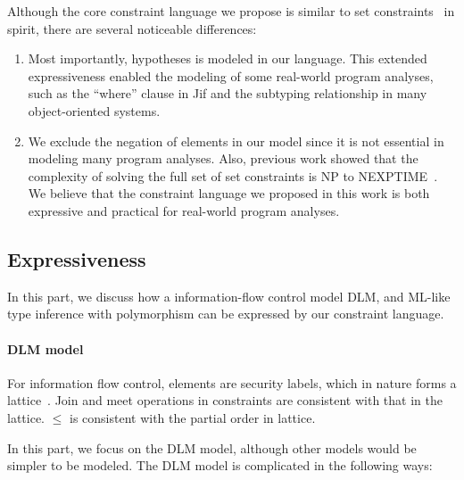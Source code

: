 Although the core constraint language we propose is similar to set
constraints~\cite{aiken-setconstraint} in spirit, there are several
noticeable differences:

\begin{enumerate}

\item Most importantly, hypotheses is modeled in our language. This extended
expressiveness enabled the modeling of some real-world program analyses, such
as the ``where'' clause in Jif and the subtyping relationship in many
object-oriented systems. 

\item We exclude the negation of elements in our model since it is not
essential in modeling many program analyses. Also, previous work showed that
the complexity of solving the full set of set constraints is NP to
NEXPTIME~\cite{aiken-complexity}. We believe that the constraint language we
proposed in this work is both expressive and practical for real-world program
analyses.

\end{enumerate}

\subsection{Expressiveness}


In this part, we discuss how a information-flow control model DLM, and ML-like
type inference with polymorphism can be expressed by our constraint language.

\paragraph{DLM model}

For information flow control, elements are security labels, which in
nature forms a lattice~\cite{denning-lattice}. Join and meet
operations in constraints are consistent with that in the lattice.
$\leq$ is consistent with the partial order in lattice.
 
In this part, we focus on the DLM model, although other models would be simpler
to be modeled. The DLM model is complicated in the following ways:

